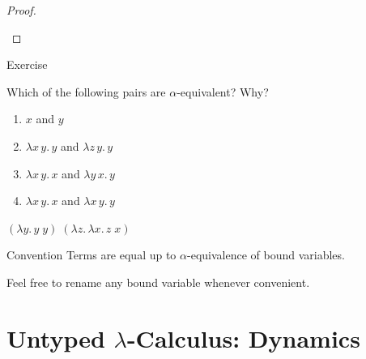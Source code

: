 \begin{frame}

  \begin{proof}
  \begin{prooftree}
  \end{prooftree}
  \end{proof}
  
\end{frame}
\begin{frame}{Exercise}

Which of the following pairs are $\alpha$-equivalent? Why?
\begin{enumerate}
  \item $x$ and $y$
  \item $\lambda x\,y.\, y$ and $\lambda z\,y.\, y$
  \item $\lambda x\,y.\, x$ and $\lambda y\,x.\, y$
  \item $\lambda x\,y.\, x$ and $\lambda x\,y.\, y$
\end{enumerate}
  
  $(\lambda y.\,y\;y)\;(\lambda z.\,\lambda x.\, z\;x)$
\begin{block}{Convention}
  Terms are equal up to $\alpha$-equivalence of bound variables.
\end{block}

Feel free to rename any bound variable whenever convenient.
\end{frame}

\section{Untyped $\lambda$-Calculus: Dynamics}
%
%

